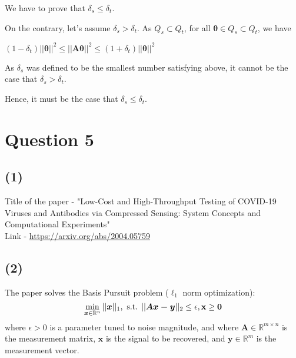 \documentclass[fleqn, 11pt]{article}
\newcommand{\bs}[1]{\boldsymbol{#1}}
\begin{document}
We have to prove that $\delta_s \leq \delta_t$. 

On the contrary, let's assume $\delta_s > \delta_t$. 
As $Q_s \subset Q_t$, for all $ \bs{\theta} \in Q_s \subset Q_t$, we have 

\begin{center}
    $ (1-\delta_t) || \bs{\theta} ||^2 \leq || \bs{A\theta} ||^2 
    \leq (1+\delta_t) || \bs{\theta} ||^2 $
\end{center}

As $\delta_s$ was defined to be the smallest number satisfying above, 
it cannot be the case that $\delta_s > \delta_t$.


Hence, it must be the case that $\delta_s \leq \delta_t$.

\newpage
\section*{Question 5}
\setcounter{equation}{0}

\subsection*{(1)}
Title of the paper - "Low-Cost and High-Throughput Testing of COVID-19 Viruses and Antibodies via Compressed Sensing: System Concepts and Computational Experiments" \\
Link - \url{https://arxiv.org/abs/2004.05759}

\subsection*{(2)}
The paper solves the Basis Pursuit problem ($\ell_1$ norm optimization): \\
$$ \min_{\bs{x} \in \mathbb{R}^n} || \bs{x} ||_1, \text{ s.t. } || \bs{Ax - y} ||_2 \le \epsilon, \bf{x} \ge 0 $$
where $\epsilon > 0$ is a parameter tuned to noise magnitude, and where $\bs{A} \in \mathbb{R}^{m \times n}$ is the measurement matrix, $\bs{x}$ is the signal to be recovered, and $\bs{y} \in \mathbb{R}^m$ is the measurement vector.
\end{document}
